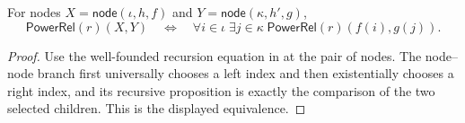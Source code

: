\begin{lemma}
For nodes $X=\mathsf{node}(\iota,h,f)$ and
$Y=\mathsf{node}(\kappa,h',g)$,
\[
\mathsf{PowerRel}(r)(X,Y)
\quad\Longleftrightarrow\quad
\forall i\in\iota\;\exists j\in\kappa\;
\mathsf{PowerRel}(r)(f(i),g(j)).
\]
\end{lemma}
\begin{proof}
Use the well-founded recursion equation in  at the pair
of nodes.  The node--node branch first universally chooses a left index and
then existentially chooses a right index, and its recursive proposition is
exactly the comparison of the two selected children.  This is the displayed
equivalence.
\end{proof}
